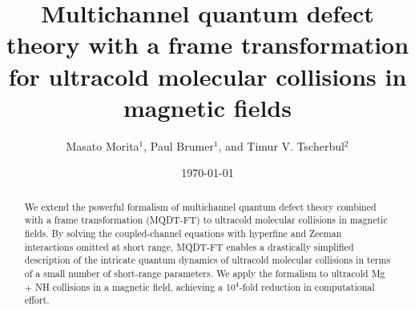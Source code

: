 \documentclass[reprint,amssymb,noeprint,twocolumn,longbibliography]{revtex4-2}
\begin{document}
\title{Multichannel quantum defect theory with a frame transformation \\ for ultracold molecular collisions in magnetic fields}



\author{Masato Morita$^{1}$, Paul Brumer$^{1}$, and Timur V. Tscherbul$^{2}$}



\date{\today}

\begin{abstract}
We extend the powerful formalism of multichannel quantum defect theory combined with a frame transformation (MQDT-FT) to ultracold molecular collisions in magnetic fields. By solving the coupled-channel equations with hyperfine and Zeeman interactions omitted at short range, MQDT-FT enables a drastically simplified description of the intricate quantum dynamics of ultracold molecular collisions in terms of a small number of short-range parameters. We apply the formalism to ultracold Mg + NH collisions in a magnetic field, achieving a 10$^4$-fold reduction in computational effort.
\end{abstract}
\maketitle

\newpage
\end{document}
